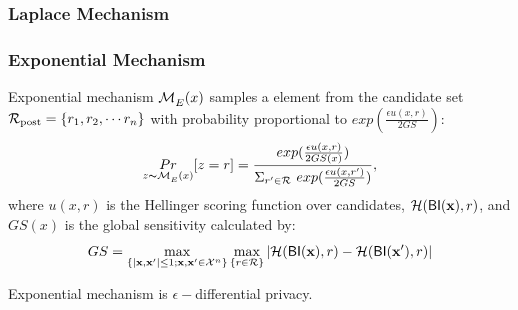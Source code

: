 \documentclass[sigconf]{acmart}
\begin{document}
\subsubsection{Laplace Mechanism}


\subsubsection{Exponential Mechanism}

Exponential mechanism $\mathcal{M}_E^{}({x})$ samples a element from the candidate set $\mathcal{R}_{\textup{post}} = \{r_1, r_2, \cdots r_n\}$ with probability proportional to $exp(\frac{\epsilon u(x,r)}{2 GS})$:
\begin{equation*}
\underset{z \thicksim \mathcal{M}_E^{}({x})}{Pr}[z=r] = \frac
{exp(\frac{\epsilon u(x,r)}{2 GS(x)})}
{\Sigma_{r' \in \mathcal{R}}\ exp(\frac{\epsilon u(x,r')}{2 GS})},
\end{equation*}
where $u(x,r)$ is the Hellinger scoring function over candidates, $\mathcal{H}(\mathsf{BI}(\textbf{x}), r)$, and $GS(x)$ is the global sensitivity calculated by:
\begin{equation*}
GS = 
\max_{\{|\textbf{x},\textbf{x}'| \leq 1;\textbf{x},\textbf{x}'\in \mathcal{X}^n\}}\max_{\{r\in \mathcal{R}\}}
|\mathcal{H}(\mathsf{BI}(\textbf{x}), r) - \mathcal{H}(\mathsf{BI}(\textbf{x}'), r)|
\end{equation*}

Exponential mechanism is $\epsilon -$differential privacy\cite{dwork2014algorithmic}.

\end{document}
